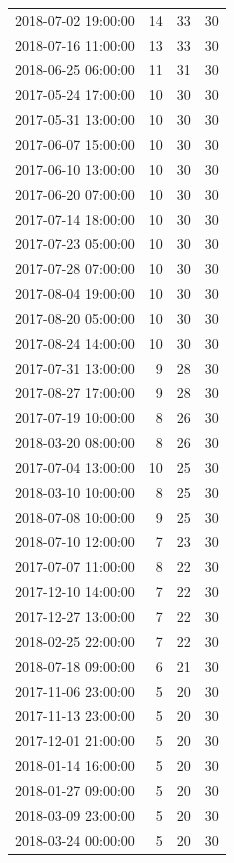 \begin{tabular}{lrrr}
2018-07-02 19:00:00 & 14 & 33 & 30 \\
2018-07-16 11:00:00 & 13 & 33 & 30 \\
2018-06-25 06:00:00 & 11 & 31 & 30 \\
2017-05-24 17:00:00 & 10 & 30 & 30 \\
2017-05-31 13:00:00 & 10 & 30 & 30 \\
2017-06-07 15:00:00 & 10 & 30 & 30 \\
2017-06-10 13:00:00 & 10 & 30 & 30 \\
2017-06-20 07:00:00 & 10 & 30 & 30 \\
2017-07-14 18:00:00 & 10 & 30 & 30 \\
2017-07-23 05:00:00 & 10 & 30 & 30 \\
2017-07-28 07:00:00 & 10 & 30 & 30 \\
2017-08-04 19:00:00 & 10 & 30 & 30 \\
2017-08-20 05:00:00 & 10 & 30 & 30 \\
2017-08-24 14:00:00 & 10 & 30 & 30 \\
2017-07-31 13:00:00 & 9 & 28 & 30 \\
2017-08-27 17:00:00 & 9 & 28 & 30 \\
2017-07-19 10:00:00 & 8 & 26 & 30 \\
2018-03-20 08:00:00 & 8 & 26 & 30 \\
2017-07-04 13:00:00 & 10 & 25 & 30 \\
2018-03-10 10:00:00 & 8 & 25 & 30 \\
2018-07-08 10:00:00 & 9 & 25 & 30 \\
2018-07-10 12:00:00 & 7 & 23 & 30 \\
2017-07-07 11:00:00 & 8 & 22 & 30 \\
2017-12-10 14:00:00 & 7 & 22 & 30 \\
2017-12-27 13:00:00 & 7 & 22 & 30 \\
2018-02-25 22:00:00 & 7 & 22 & 30 \\
2018-07-18 09:00:00 & 6 & 21 & 30 \\
2017-11-06 23:00:00 & 5 & 20 & 30 \\
2017-11-13 23:00:00 & 5 & 20 & 30 \\
2017-12-01 21:00:00 & 5 & 20 & 30 \\
2018-01-14 16:00:00 & 5 & 20 & 30 \\
2018-01-27 09:00:00 & 5 & 20 & 30 \\
2018-03-09 23:00:00 & 5 & 20 & 30 \\
2018-03-24 00:00:00 & 5 & 20 & 30 \\

\end{tabular}
